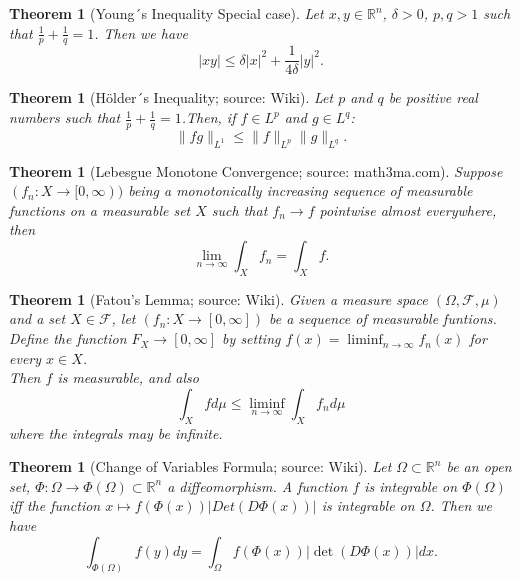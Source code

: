 \documentclass[12pt,a4paper]{article}
\newtheorem{thm}[definition]{Theorem}
\newcommand{\Rn}{\mathbb{R}^n}
\begin{document}
\begin{thm}[Young´s Inequality Special case]
Let $x,y\in \Rn$, $\delta > 0$, $p,q>1$ such that $\frac{1}{p} + \frac{1}{q} = 1$. Then we have
\begin{equation}
\vert xy\vert \leq \delta \vert x \vert^2 + \frac{1}{4\delta}\vert y \vert^2.
\end{equation}
\end{thm}

\begin{thm} [Hölder´s Inequality; source: Wiki]
Let $p$ and $q$ be positive real numbers such that $\frac{1}{p} + \frac{1}{q} = 1$.Then, if $f \in L^p$ and $g\in L^q$:
\begin{equation}
\lVert fg \rVert_{L^1} \leq \lVert f \rVert_{L^p} \lVert g \rVert_{L^q}.
\end{equation}
\end{thm}

\begin{thm}[Lebesgue Monotone Convergence; source: math3ma.com]
Suppose $(f_n:X\rightarrow [0,\infty))$ being a monotonically increasing sequence of measurable functions on a measurable set $X$ such that $f_n\rightarrow f$ pointwise almost everywhere, then
\begin{equation}
\lim_{n\rightarrow\infty} \int_X f_n = \int_X f.
\end{equation}
\end{thm}

\begin{thm}[Fatou's Lemma; source: Wiki]
Given a measure space $(\Omega, \mathcal{F}, \mu)$ and a set $X\in \mathcal{F}$, let $(f_n:X\rightarrow [0,\infty])$ be  a sequence of measurable funtions. Define the function $F_X\rightarrow[0,\infty]$ by setting $f(x)=\liminf_{n\rightarrow\infty} f_n(x)$ for every $x\in X$.\\
Then $f$ is measurable, and also
\begin{equation}
\int_X f d\mu \leq \liminf_{n\rightarrow \infty}\int_X f_n d\mu
\end{equation} 
where the integrals may be infinite.
\end{thm}

\begin{thm}[Change of Variables Formula; source: Wiki]
Let $\Omega \subset \Rn$ be an open set, $\Phi: \Omega \rightarrow \Phi(\Omega)\subset\Rn$ a diffeomorphism. A function $f$ is integrable on $\Phi(\Omega)$ iff the function $x \mapsto f(\Phi(x))\lvert Det(D\Phi(x)) \rvert$ is integrable on $\Omega$. Then we have
\begin{equation}
\int_{\Phi(\Omega)} f(y) dy = \int_{\Omega} f(\Phi(x))\lvert \det(D\Phi(x)) \rvert dx.
\end{equation}
\end{thm}
\end{document}
